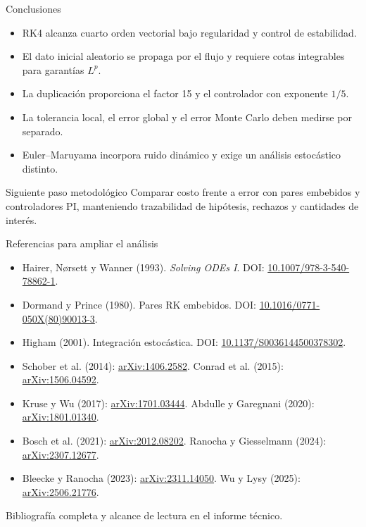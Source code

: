\documentclass[aspectratio=169,11pt]{beamer}
\begin{document}
\begin{frame}{Conclusiones}
\begin{itemize}
\item RK4 alcanza cuarto orden vectorial bajo regularidad y control de estabilidad.
\item El dato inicial aleatorio se propaga por el flujo y requiere cotas integrables para garantías $L^p$.
\item La duplicación proporciona el factor 15 y el controlador con exponente $1/5$.
\item La tolerancia local, el error global y el error Monte Carlo deben medirse por separado.
\item Euler--Maruyama incorpora ruido dinámico y exige un análisis estocástico distinto.
\end{itemize}
\begin{block}{Siguiente paso metodológico}
Comparar costo frente a error con pares embebidos y controladores PI,
manteniendo trazabilidad de hipótesis, rechazos y cantidades de interés.
\end{block}
\end{frame}

\begin{frame}{Referencias para ampliar el análisis}
\footnotesize
\begin{itemize}
\item Hairer, Nørsett y Wanner (1993). \emph{Solving ODEs I}.
DOI: \href{https://doi.org/10.1007/978-3-540-78862-1}{10.1007/978-3-540-78862-1}.
\item Dormand y Prince (1980). Pares RK embebidos.
DOI: \href{https://doi.org/10.1016/0771-050X(80)90013-3}{10.1016/0771-050X(80)90013-3}.
\item Higham (2001). Integración estocástica.
DOI: \href{https://doi.org/10.1137/S0036144500378302}{10.1137/S0036144500378302}.
\item Schober et al. (2014): \href{https://arxiv.org/abs/1406.2582}{arXiv:1406.2582}.
Conrad et al. (2015): \href{https://arxiv.org/abs/1506.04592}{arXiv:1506.04592}.
\item Kruse y Wu (2017): \href{https://arxiv.org/abs/1701.03444}{arXiv:1701.03444}.
Abdulle y Garegnani (2020): \href{https://arxiv.org/abs/1801.01340}{arXiv:1801.01340}.
\item Bosch et al. (2021): \href{https://arxiv.org/abs/2012.08202}{arXiv:2012.08202}.
Ranocha y Giesselmann (2024): \href{https://arxiv.org/abs/2307.12677}{arXiv:2307.12677}.
\item Bleecke y Ranocha (2023): \href{https://arxiv.org/abs/2311.14050}{arXiv:2311.14050}.
Wu y Lysy (2025): \href{https://arxiv.org/abs/2506.21776}{arXiv:2506.21776}.
\end{itemize}
\small Bibliografía completa y alcance de lectura en el informe técnico.
\end{frame}
\end{document}
